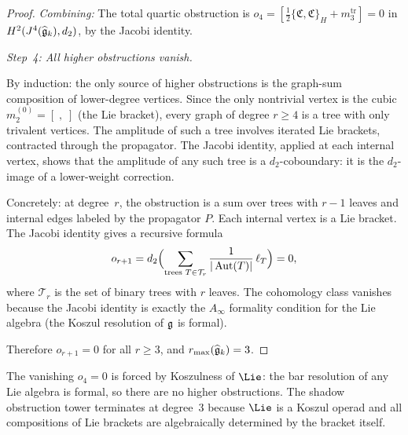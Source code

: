 \begin{proof}
\emph{Combining:}
The total quartic obstruction is
$o_4 = [\frac{1}{2}\{\mathfrak{C}, \mathfrak{C}\}_H
+ m_3^{\mathrm{tr}}] = 0$
in $H^2(J^4(\widehat{\mathfrak{g}}_k), d_2)$, by the Jacobi identity.

\medskip
\emph{Step~4: All higher obstructions vanish.}

By induction: the only source of higher obstructions is
the graph-sum composition of lower-degree vertices. Since
the only nontrivial vertex is the cubic
$m_2^{(0)} = [\;,\;]$ (the Lie bracket), every graph of
degree $r \geq 4$ is a tree with only trivalent vertices.
The amplitude of such a tree involves iterated Lie
brackets, contracted through the propagator. The Jacobi
identity, applied at each internal vertex, shows that
the amplitude of any such tree is a $d_2$-coboundary:
it is the $d_2$-image of a lower-weight correction.

Concretely: at degree~$r$, the obstruction is a sum over
trees with $r-1$ leaves and internal edges labeled by
the propagator $P$. Each internal vertex is a Lie
bracket. The Jacobi identity gives a recursive formula
\begin{equation}\label{eq:jacobi-recursive-vanishing}
o_{r+1} = d_2\Bigl(
\sum_{\text{trees } T \in \mathcal{T}_{r}}
\frac{1}{|\operatorname{Aut}(T)|}\,\ell_T
\Bigr) = 0,
\end{equation}
where $\mathcal{T}_r$ is the set of binary trees with
$r$ leaves. The cohomology class vanishes because the
Jacobi identity is exactly the $A_\infty$ formality
condition for the Lie algebra (the Koszul resolution of
$\mathfrak{g}$ is formal).

Therefore $o_{r+1} = 0$ for all $r \geq 3$, and
$r_{\max}(\widehat{\mathfrak{g}}_k) = 3$.
\end{proof}

\begin{remark}
\label{rem:jacobi-termination}
The vanishing $o_4 = 0$ is forced by Koszulness of $\Lie$:
the bar resolution of any Lie algebra is formal, so
there are no higher obstructions. The shadow obstruction tower
terminates at degree~$3$ because $\Lie$ is a Koszul operad
and all compositions of Lie brackets are algebraically
determined by the bracket itself.
\end{remark}


